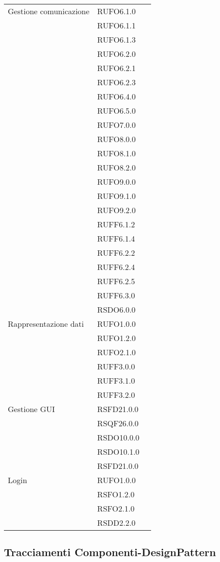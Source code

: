 \begin{center}
\begin{longtable}{lp{}l}
Gestione comunicazione & RUFO6.1.0\\
& RUFO6.1.1\\
& RUFO6.1.3\\
& RUFO6.2.0\\
& RUFO6.2.1\\
& RUFO6.2.3\\
& RUFO6.4.0\\
& RUFO6.5.0\\
& RUFO7.0.0\\
& RUFO8.0.0\\
& RUFO8.1.0\\
& RUFO8.2.0\\
& RUFO9.0.0\\
& RUFO9.1.0\\
& RUFO9.2.0\\
& RUFF6.1.2\\
& RUFF6.1.4\\
& RUFF6.2.2\\
& RUFF6.2.4\\
& RUFF6.2.5\\
& RUFF6.3.0\\
& RSDO6.0.0\\
Rappresentazione dati & RUFO1.0.0\\
& RUFO1.2.0\\
& RUFO2.1.0\\
& RUFF3.0.0\\
& RUFF3.1.0\\
& RUFF3.2.0\\
Gestione GUI & RSFD21.0.0\\
& RSQF26.0.0\\
& RSDO10.0.0\\
& RSDO10.1.0\\
& RSFD21.0.0\\
Login & RUFO1.0.0\\
& RSFO1.2.0\\
& RSFO2.1.0\\
& RSDD2.2.0\\
\bottomrule
\end{longtable}
\end{center}
\subsection{Tracciamenti Componenti-DesignPattern}\label{sec:tracCompDp}

